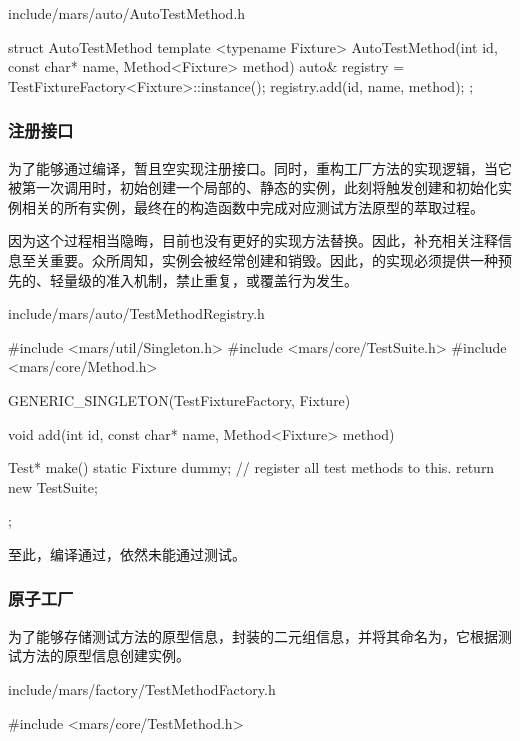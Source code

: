 \begin{content}
\begin{nodiff}{include/mars/auto/AutoTestMethod.h}
\begin{c++}
struct AutoTestMethod {
  template <typename Fixture>
  AutoTestMethod(int id, const char* name, Method<Fixture> method) {
    auto& registry = TestFixtureFactory<Fixture>::instance();
    registry.add(id, name, method);
  }
};
 \end{c++}
\end{nodiff}

\subsubsection{注册接口}

为了能够通过编译，暂且空实现注册接口。同时，重构工厂方法的实现逻辑，当它被第一次调用时，初始创建一个局部的、静态的实例，此刻将触发创建和初始化实例相关的所有实例，最终在的构造函数中完成对应测试方法原型的萃取过程。

因为这个过程相当隐晦，目前也没有更好的实现方法替换。因此，补充相关注释信息至关重要。众所周知，实例会被经常创建和销毁。因此，的实现必须提供一种预先的、轻量级的准入机制，禁止重复，或覆盖行为发生。

\begin{nodiff}{include/mars/auto/TestMethodRegistry.h}
 \begin{c++}
#include <mars/util/Singleton.h>
#include <mars/core/TestSuite.h>
#include <mars/core/Method.h>

GENERIC_SINGLETON(TestFixtureFactory, Fixture) {
  void add(int id, const char* name, Method<Fixture> method) {
  }

  Test* make() {
    static Fixture dummy; // register all test methods to this.
    return new TestSuite;
  }
};
 \end{c++}
\end{nodiff}

至此，编译通过，依然未能通过测试。

\subsubsection{原子工厂}

为了能够存储测试方法的原型信息，封装的二元组信息，并将其命名为，它根据测试方法的原型信息创建实例。

\begin{nodiff}{include/mars/factory/TestMethodFactory.h}
 \begin{c++}
#include <mars/core/TestMethod.h>


\end{c++}
\end{nodiff}
\end{content}

